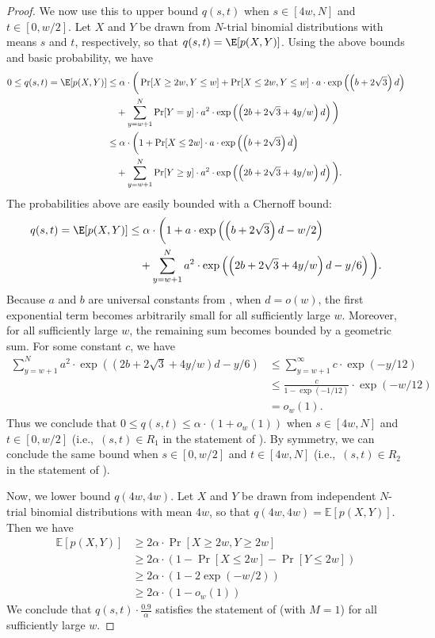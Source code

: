 \begin{proof}
We now use this to upper bound $q(s, t)$ when $s \in [4w, N]$ and $t \in [0, w/2]$. Let $X$ and $Y$ be drawn from $N$-trial binomial distributions with means $s$ and $t$, respectively,
so that $q(s, t) = \E[p(X,Y)]$. Using the above bounds and basic probability, we have 
\begin{align}
0 \leq q(s, t) = \E[p(X,Y)] &\le \alpha \cdot \bigg( \Pr[X \ge 2w, Y \le w] + \Pr[X \le 2w, Y \le w] \cdot a \cdot \exp\left(\left(b+2\sqrt{3}\right)d\right)  \nonumber \\
& \quad + \sum_{y = w+1}^N \Pr[Y = y] \cdot a^2 \cdot \exp\left(\left(2b + 2\sqrt{3} + 4y/w\right)d\right) \bigg)\\
&\le \alpha \cdot \bigg(1 + \Pr[X \le 2w] \cdot a \cdot \exp\left(\left(b+2\sqrt{3}\right)d\right)   \nonumber \\
& \quad + \sum_{y = w+1}^N \Pr[Y \ge y] \cdot a^2 \cdot \exp\left(\left(2b + 2\sqrt{3} + 4y/w\right)d\right)\bigg).
\end{align}
The probabilities above are easily bounded with a Chernoff bound:
\begin{align}
q(s, t)=\E[p(X,Y)] &\le \alpha \cdot \bigg( 1 + a \cdot \exp\left(\left(b+2\sqrt{3}\right)d - w/2\right)  \nonumber\\
& \quad + \sum_{y = w+1}^N a^2 \cdot \exp\left(\left(2b + 2\sqrt{3} + 4y/w\right)d - y/6\right)\bigg).
\end{align}
Because $a$ and $b$ are universal constants from , when $d = o(w)$, the first exponential term becomes arbitrarily small for all sufficiently large $w$. Moreover, for all sufficiently large $w$, the remaining sum becomes bounded by a geometric sum. For some constant $c$, we have
\begin{align*}
\sum_{y = w+1}^N a^2 \cdot \exp\left(\left(2b + 2\sqrt{3} + 4y/w\right)d - y/6\right) &\le \sum_{y = w+1}^\infty c \cdot \exp\left(-y/12\right)\\
&\le \frac{c}{1 - \exp(-1/12)} \cdot \exp(-w/12)\\
&= o_w(1).
\end{align*}
Thus we conclude that $0 \le q(s, t) \le \alpha \cdot (1 + o_w(1))$ when $s \in [4w, N]$ and $t \in [0, w/2]$ (i.e.,\ $(s, t) \in R_1$ in the statement of ). By symmetry, we can conclude the same bound when $s \in [0, w/2]$ and $t \in [4w, N]$ (i.e.,\ $(s, t) \in R_2$ in the statement of ).

Now, we lower bound $q(4w, 4w)$. Let $X$ and $Y$ be drawn from independent $N$-trial binomial distributions with mean $4w$, so that $q(4w, 4w) = \mathbb{E}\left[p(X,Y)\right]$. Then we have 
\begin{align*}
\mathbb{E}\left[p(X,Y)\right] &\ge 2\alpha \cdot \Pr[X \ge 2w, Y \ge 2w]\\
&\ge 2\alpha \cdot \left(1 - \Pr[X \le 2w] - \Pr[Y \le 2w]\right)\\
&\ge 2\alpha \cdot \left(1 - 2\exp(-w/2)\right)\\
&\ge 2\alpha \cdot (1 - o_w(1))
\end{align*}
We conclude that $q(s, t) \cdot \frac{0.9}{\alpha}$ satisfies the statement of  (with $M=1$) for all sufficiently large $w$.
\end{proof}


